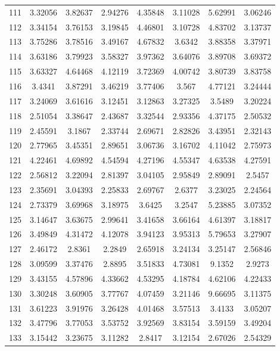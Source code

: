 \begin{center}
\begin{longtable}{cccccccc}
111 & 3.32056 & 3.82637 & 2.94276 & 4.35848 & 3.11028 & 5.62991 & 3.06246\\
112 & 3.34154 & 3.76153 & 3.19845 & 4.46801 & 3.10728 & 4.83702 & 3.13737\\
113 & 3.75286 & 3.78516 & 3.49167 & 4.67832 & 3.6342 & 3.88358 & 3.37971\\
114 & 3.63186 & 3.79923 & 3.58327 & 3.97362 & 3.64076 & 3.89708 & 3.69372\\
115 & 3.63327 & 4.64468 & 4.12119 & 3.72369 & 4.00742 & 3.80739 & 3.83758\\
116 & 3.4341 & 3.87291 & 3.46219 & 3.77406 & 3.567 & 4.77121 & 3.24444\\
117 & 3.24069 & 3.61616 & 3.12451 & 3.12863 & 3.27325 & 3.5489 & 3.20224\\
118 & 2.51054 & 3.38647 & 2.43687 & 3.32544 & 2.93356 & 4.37175 & 2.50532\\
119 & 2.45591 & 3.1867 & 2.33744 & 2.69671 & 2.82826 & 3.43951 & 2.32143\\
120 & 2.77965 & 3.45351 & 2.89651 & 3.06736 & 3.16702 & 4.11042 & 2.75973\\
121 & 4.22461 & 4.69892 & 4.54594 & 4.27196 & 4.55347 & 4.63538 & 4.27591\\
122 & 2.56812 & 3.22094 & 2.81397 & 3.04105 & 2.95849 & 2.89091 & 2.5457\\
123 & 2.35691 & 3.04393 & 2.25833 & 2.69767 & 2.6377 & 3.23025 & 2.24564\\
124 & 2.73379 & 3.69968 & 3.18975 & 3.6425 & 3.2547 & 5.23885 & 3.07352\\
125 & 3.14647 & 3.63675 & 2.99641 & 3.41658 & 3.66164 & 4.61397 & 3.18817\\
126 & 3.49849 & 4.31472 & 4.12078 & 3.94123 & 3.95313 & 5.79653 & 3.27907\\
127 & 2.46172 & 2.8361 & 2.2849 & 2.65918 & 3.24134 & 3.25147 & 2.56846\\
128 & 3.09599 & 3.37476 & 2.8895 & 3.51833 & 4.73081 & 9.1352 & 2.9273\\
129 & 3.43155 & 4.57896 & 4.33662 & 4.53295 & 4.18784 & 4.62106 & 4.22433\\
130 & 3.30248 & 3.60905 & 3.77767 & 4.07459 & 3.21146 & 9.66695 & 3.11375\\
131 & 3.61223 & 3.91976 & 3.26428 & 4.01468 & 3.57513 & 3.4133 & 3.05207\\
132 & 3.47796 & 3.77053 & 3.53752 & 3.92569 & 3.83154 & 3.59159 & 3.49204\\
133 & 3.15442 & 3.23675 & 3.11282 & 2.8417 & 3.12154 & 2.67026 & 2.54329\\

\end{longtable}
\end{center}
